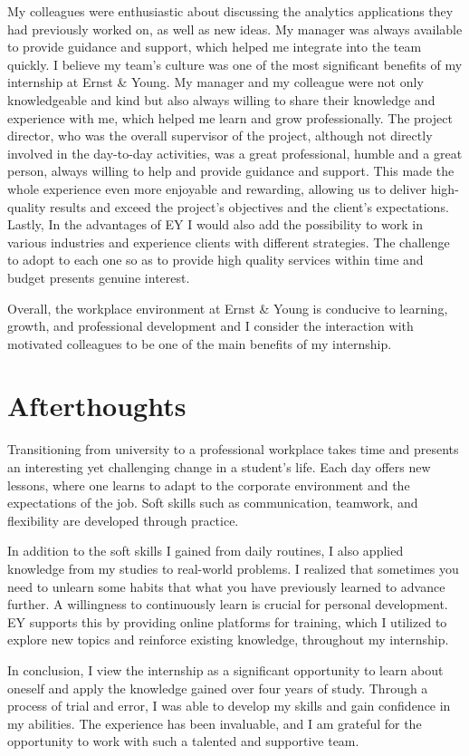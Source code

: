 My colleagues were enthusiastic about discussing the analytics applications
they had previously worked on, as well as new ideas. My manager was always
available to provide guidance and support, which helped me integrate into the
team quickly. I believe my team's culture was one of the most significant
benefits of my internship at Ernst \& Young. My manager and my colleague were
not only knowledgeable and kind but also always willing to share their
knowledge and experience with me, which helped me learn and grow
professionally. The project director, who was the overall supervisor of the
project, although not directly involved in the day-to-day activities, was a
great professional, humble and a great person, always willing to help and
provide guidance and support. This made the whole experience even more
enjoyable and rewarding, allowing us to deliver high-quality results and exceed
the project's objectives and the client's expectations. Lastly, In the
advantages of EY I would also add the possibility to work in various industries
and experience clients with different strategies. The challenge to adopt to
each one so as to provide high quality services within time and budget presents
genuine interest.

Overall, the workplace environment at Ernst \& Young is conducive to learning,
growth, and professional development and I consider the interaction with
motivated colleagues to be one of the main benefits of my internship.

\section{Afterthoughts}

Transitioning from university to a professional workplace takes time and
presents an interesting yet challenging change in a student's life. Each day
offers new lessons, where one learns to adapt to the corporate environment and
the expectations of the job. Soft skills such as communication, teamwork, and
flexibility are developed through practice.

In addition to the soft skills I gained from daily routines, I also applied
knowledge from my studies to real-world problems. I realized that sometimes you
need to unlearn some habits that what you have previously learned to advance
further. A willingness to continuously learn is crucial for personal
development. EY supports this by providing online platforms for training, which
I utilized to explore new topics and reinforce existing knowledge, throughout
my internship.

In conclusion, I view the internship as a significant opportunity to learn
about oneself and apply the knowledge gained over four years of study. Through
a process of trial and error, I was able to develop my skills and gain
confidence in my abilities. The experience has been invaluable, and I am
grateful for the opportunity to work with such a talented and supportive team.